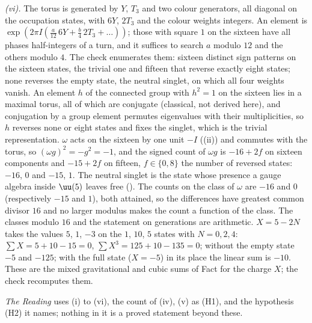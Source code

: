 \emph{(vi).} The torus is generated by $Y$, $T_{3}$ and two colour generators, all diagonal on the occupation states, with $6Y$, $2T_{3}$ and the colour weights integers. An element is $\exp(2\pi I(\tfrac{a}{12}\,6Y + \tfrac{b}{4}\,2T_{3} + \dots))$; those with square $1$ on the sixteen have all phases half-integers of a turn, and it suffices to search $a$ modulo $12$ and the others modulo $4$. The check enumerates them: sixteen distinct sign patterns on the sixteen states, the trivial one and fifteen that reverse exactly eight states; none reverses the empty state, the neutral singlet, on which all four weights vanish. An element $h$ of the connected group with $h^{2} = 1$ on the sixteen lies in a maximal torus, all of which are conjugate (classical, not derived here), and conjugation by a group element permutes eigenvalues with their multiplicities, so $h$ reverses none or eight states and fixes the singlet, which is the trivial representation. $\omega$ acts on the sixteen by one unit $-I$ ((ii)) and commutes with the torus, so $(\omega g)^{2} = -g^{2} = -1$, and the signed count of $\omega g$ is $-16 + 2f$ on sixteen components and $-15 + 2f$ on fifteen, $f \in \{0, 8\}$ the number of reversed states: $-16$, $0$ and $-15$, $1$. The neutral singlet is the state whose presence a gauge algebra inside $\uu(5)$ leaves free (). The counts on the class of $\omega$ are $-16$ and $0$ (respectively $-15$ and $1$), both attained, so the differences have greatest common divisor $16$ and no larger modulus makes the count a function of the class. The classes modulo $16$ and the statement on generations are arithmetic. $X = 5 - 2N$ takes the values $5$, $1$, $-3$ on the $1$, $10$, $5$ states with $N = 0, 2, 4$: $\sum X = 5 + 10 - 15 = 0$, $\sum X^{3} = 125 + 10 - 135 = 0$; without the empty state $-5$ and $-125$; with the full state ($X = -5$) in its place the linear sum is $-10$. These are the mixed gravitational and cubic sums of Fact  for the charge $X$; the check recomputes them.

\emph{The Reading} uses (i) to (vi), the count of (iv), (v) as (H1), and the hypothesis (H2) it names; nothing in it is a proved statement beyond these.
